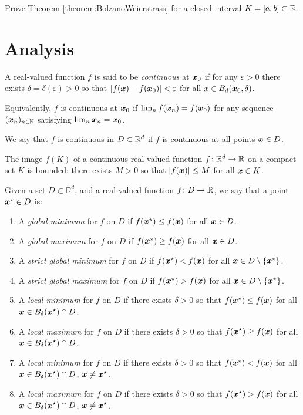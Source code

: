 \begin{problem}\label{problem:BolzanoWeierstrass}
Prove Theorem \ref{theorem:BolzanoWeierstrass} for a closed interval $K=[a,b] \subset \mathbb{R}$.
\end{problem}

\section{Analysis}

A real-valued function $f$ is said to be \emph{continuous} at $\boldsymbol{x}_0$ if for any $\varepsilon>0$ there exists $\delta = \delta(\varepsilon)>0$ so that $\lvert f(\boldsymbol{x}) - f(\boldsymbol{x}_0) \rvert < \varepsilon$ for all $x \in B_d(\boldsymbol{x}_0, \delta)$.

Equivalently, $f$ is continuous at $\boldsymbol{x}_0$ if $\lim_n f(\boldsymbol{x}_n) = f(\boldsymbol{x}_0)$ for any sequence $({\boldsymbol{x}}_{n})_{{n}\in\mathbb{N}}$ satisfying $\lim_n \boldsymbol{x}_n = \boldsymbol{x}_0$.  

We say that $f$ is continuous in $D \subset \mathbb{R}^d$ if $f$ is continuous at all points $\boldsymbol{x} \in D$.

\begin{theorem}\label{theorem:BVT}
The image $f(K)$ of a continuous real-valued function $f \colon \mathbb{R}^d \to \mathbb{R}$ on a compact set $K$ is bounded: there exists $M>0$ so that $\lvert  f(\boldsymbol{x})  \rvert \leq M$ for all $\boldsymbol{x} \in K$.
\end{theorem}

Given a set $D \subset \mathbb{R}^d$, and a real-valued function $f\colon D \to \mathbb{R}$, we say that a point $\boldsymbol{x}^{\star} \in D$ is:
\begin{enumerate}
	\item A \emph{global minimum} for $f$ on $D$ if $f(\boldsymbol{x}^{\star}) \leq f(\boldsymbol{x})$ for all $\boldsymbol{x} \in D$.
	\item A \emph{global maximum} for $f$ on $D$ if $f(\boldsymbol{x}^{\star}) \geq f(\boldsymbol{x})$ for all $\boldsymbol{x} \in D$.
	\item A \emph{strict global minimum} for $f$ on $D$ if $f(\boldsymbol{x}^{\star}) < f(\boldsymbol{x})$ for all $\boldsymbol{x} \in D \setminus \{ \boldsymbol{x}^{\star} \}$.
	\item A \emph{strict global maximum} for $f$ on $D$ if $f(\boldsymbol{x}^{\star}) > f(\boldsymbol{x})$ for all $\boldsymbol{x} \in D \setminus \{ \boldsymbol{x}^{\star} \}$.
	\item A \emph{local minimum} for $f$ on $D$ if there exists $\delta>0$ so that  $f(\boldsymbol{x}^{\star}) \leq f(\boldsymbol{x})$ for all $\boldsymbol{x} \in B_\delta(\boldsymbol{x}^{\star})\cap D$.
	\item A \emph{local maximum} for $f$ on $D$ if there exists $\delta>0$ so that  $f(\boldsymbol{x}^{\star}) \geq f(\boldsymbol{x})$ for all $\boldsymbol{x} \in B_\delta(\boldsymbol{x}^{\star})\cap D$.
	\item A \emph{local minimum} for $f$ on $D$ if there exists $\delta>0$ so that  $f(\boldsymbol{x}^{\star}) < f(\boldsymbol{x})$ for all $\boldsymbol{x} \in B_\delta(\boldsymbol{x}^{\star})\cap D$, $\boldsymbol{x} \neq \boldsymbol{x}^{\star}$.
	\item A \emph{local maximum} for $f$ on $D$ if there exists $\delta>0$ so that  $f(\boldsymbol{x}^{\star}) > f(\boldsymbol{x})$ for all $\boldsymbol{x} \in B_\delta(\boldsymbol{x}^{\star})\cap D$, $\boldsymbol{x} \neq \boldsymbol{x}^{\star}$.
\end{enumerate}

